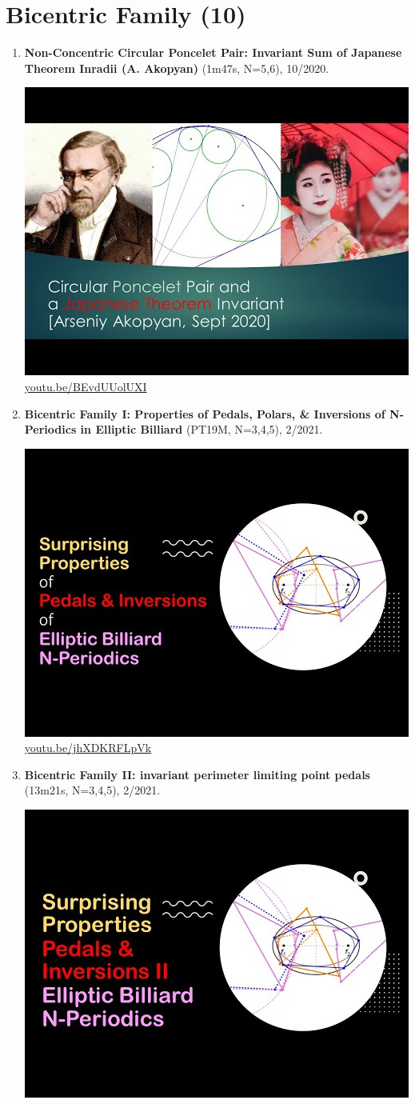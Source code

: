 \documentclass[12pt]{amsart}
\begin{document}
\section{Bicentric Family (10)}

\begin{enumerate}[resume]
\item \textbf{Non-Concentric Circular Poncelet Pair: Invariant Sum of Japanese Theorem Inradii (A. Akopyan)} (1m47s, N=5,6), 10/2020. 
\begin{center}\includegraphics[width=.5\textwidth]{pics/BEvdUUolUXI.jpg} \\ 
\href{https://youtu.be/BEvdUUolUXI}{\url{youtu.be/BEvdUUolUXI}}\end{center}
% 
\item \textbf{Bicentric Family I: Properties of Pedals, Polars, \& Inversions of N-Periodics in Elliptic Billiard} (PT19M, N=3,4,5), 2/2021. 
\begin{center}\includegraphics[width=.5\textwidth]{pics/jhXDKRFLpVk.jpg} \\ 
\href{https://youtu.be/jhXDKRFLpVk}{\url{youtu.be/jhXDKRFLpVk}}\end{center}
% 
\item \textbf{Bicentric Family II: invariant perimeter limiting point pedals} (13m21s, N=3,4,5), 2/2021. 
\begin{center}\includegraphics[width=.5\textwidth]{pics/A7F3szW7rUE.jpg} \\ 

\end{center}
\end{enumerate}
\end{document}
